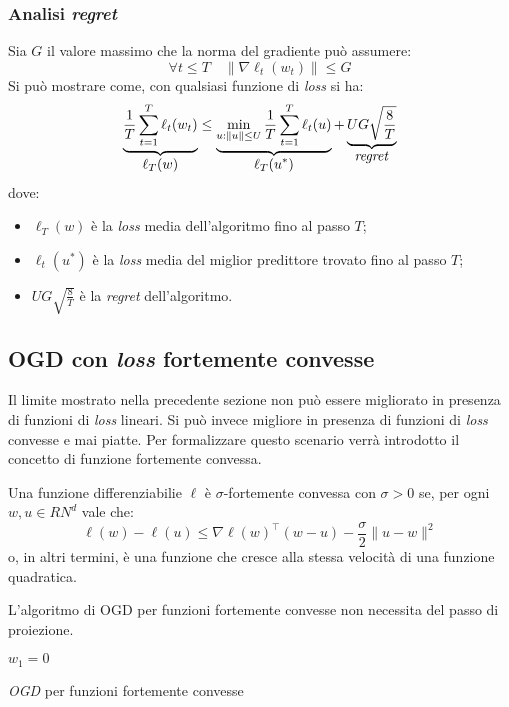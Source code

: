 \subsubsection{Analisi \textit{regret}}
Sia $G$ il valore massimo che la norma del gradiente può assumere:
$$ \forall t\leq T \quad \| \nabla\ell_t(w_t)\|\leq G  $$
Si può mostrare come, con qualsiasi funzione di \textit{loss} si ha:
$$
\underbrace{\frac{1}{T}\sum_{t=1}^{T}\ell_t(w_t)}_{\displaystyle\ell_T(w)}\leq
\underbrace{\min_{u:\|u\|\leq U} \frac{1}{T}\sum_{t=1}^T \ell_t(u)}_
    {\displaystyle\ell_T(u^*)}
+\underbrace{UG\sqrt{\frac{8}{T}}}_{\displaystyle\text{\textit{regret}}}
$$
dove:
\begin{itemize}
    \item $\ell_T(w)$ è la \textit{loss} media dell'algoritmo fino al passo $T$;
    \item $\ell_t(u^*)$ è la \textit{loss} media del miglior predittore trovato
        fino al passo $T$;
    \item $UG\sqrt{\frac{8}{T}}$ è la \textit{regret} dell'algoritmo.
\end{itemize}

\subsection{OGD con \textit{loss} fortemente convesse}
Il limite mostrato nella precedente sezione non può essere migliorato in presenza
di funzioni di \textit{loss} lineari. Si può invece migliore in presenza di
funzioni di \textit{loss} convesse e mai piatte. Per formalizzare questo scenario
verrà introdotto il concetto di funzione fortemente convessa.

Una funzione differenziabilie $\ell$ è $\sigma$-fortemente convessa con $\sigma>0$
se, per ogni $w,u \in RN^d$ vale che:
$$ \ell(w) - \ell(u) \leq \nabla\ell(w)^\top (w-u)-\frac{\sigma}{2}\|u-w\|^2 $$
o, in altri termini, è una funzione che cresce alla stessa velocità di una funzione
quadratica.

L'algoritmo di OGD per funzioni fortemente convesse non necessita del passo di
proiezione.

\begin{algorithm}[H]
    \DontPrintSemicolon
    $w_1 = 0\qquad$ \;
    \caption{\textit{OGD} per funzioni fortemente convesse}
\end{algorithm}

